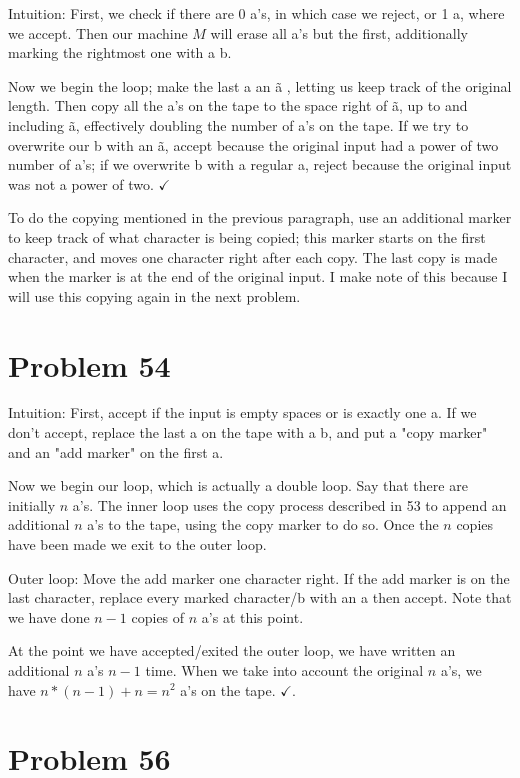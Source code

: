 \documentclass[11pt]{article}
\begin{document}
Intuition: First, we check if there are 0 a's, in which case we reject, or 1 a, where we accept. Then our machine $M$ will erase all a's but the first, additionally marking the rightmost one with a b. 

Now we begin the loop; make the last a an \~a , letting us keep track of the original length. Then copy all the a's on the tape to the space right of \~a, up to and including \~a, effectively doubling the number of a's on the tape. If we try to overwrite our b with an \~a, accept because the original input had a power of two number of a's; if we overwrite b with a regular a, reject because the original input was not a power of two. $\checkmark$

To do the copying mentioned in the previous paragraph, use an additional marker to keep track of what character is being copied; this marker starts on the first character, and moves one character right after each copy. The last copy is made when the marker is at the end of the original input. I make note of this because I will use this copying again in the next problem.


\section*{Problem 54}

Intuition: First, accept if the input is empty spaces or is exactly one a. If we don't accept, replace the last a on the tape with a b, and put a "copy marker" and an "add marker" on the first a.

Now we begin our loop, which is actually a double loop. Say that there are initially $n$ a's. The inner loop uses the copy process described in 53 to append an additional $n$ a's to the tape, using the copy marker to do so. Once the $n$ copies have been made we exit to the outer loop.

Outer loop: Move the add marker one character right. If the add marker is on the last character, replace every marked character/b with an a then accept. Note that we have done $n-1$ copies of $n$ a's at this point.


At the point we have accepted/exited the outer loop, we have written an additional $n$ a's $n-1$ time. When we take into account the original $n$ a's, we have $n * (n-1) +n = n^2$ a's on the tape. $\checkmark$.





\section*{Problem 56}
\end{document}
